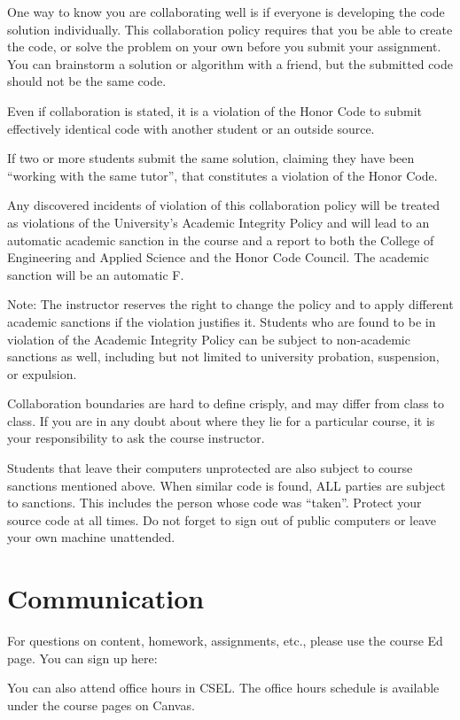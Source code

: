 One way to know you are collaborating well is if everyone is developing the code solution individually. This collaboration policy requires that you be able to create the code, or solve the problem on your own before you submit your assignment. You can brainstorm a solution or algorithm with a friend, but the submitted code should not be the same code.

Even if collaboration is stated, it is a violation of the Honor Code to submit effectively identical code with another student or an outside source. 

If two or more students submit the same solution, claiming they have been “working with the same tutor”, that constitutes a violation of the Honor Code.

Any discovered incidents of violation of this collaboration policy will be treated as violations of the University’s Academic Integrity Policy and will lead to an automatic academic sanction in the course and a report to both the College of Engineering and Applied Science and the Honor Code Council. The academic sanction will be an automatic F.

Note: The instructor reserves the right to change the policy and to apply different academic sanctions if the violation justifies it. Students who are found to be in violation of the Academic Integrity Policy can be subject to non-academic sanctions as well, including but not limited to university probation, suspension, or expulsion.

Collaboration boundaries are hard to define crisply, and may differ from class to class. If you are in any doubt about where they lie for a particular course, it is your responsibility to ask the course instructor.

Students that leave their computers unprotected are also subject to course sanctions mentioned above. When similar code is found, ALL parties are subject to sanctions. This includes the person whose code was “taken”. Protect your source code at all times. Do not forget to sign out of public computers or leave your own machine unattended.

\section{Communication}

For questions on content, homework, assignments, etc., please use the course Ed page. You can sign up here: 

You can also attend office hours in CSEL. The office hours schedule is available under the course pages on Canvas.

